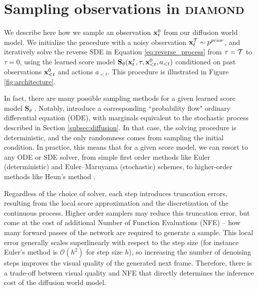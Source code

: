 \section{Sampling observations in \textsc{diamond}}
\label{appendix:sampling}

We describe here how we sample an observation $\mathbf{x}_t^0$ from our diffusion world model. We initialize the procedure with a noisy observation $\mathbf{x}_t^{\mathcal{T}} \sim p^{prior}$, and iteratively solve the reverse SDE in Equation \ref{eq:reverse_process} from $\tau = \mathcal{T}$ to $\tau = 0$, using the learned score model $\mathbf{S}_\theta(\mathbf{x}_t^\tau, \tau, \mathbf{x}_{<t}^0, a_{<t})$ conditioned on past observations $\mathbf{x}_{<t}^0$ and actions $a_{<t}$. This procedure is illustrated in Figure \ref{fig:architecture}.

In fact, there are many possible sampling methods for a given learned score model $\mathbf{S}_\theta$ \citep{karras2022elucidating}. Notably, \citet{song_sde} introduce a corresponding ``probability flow" ordinary differential equation (ODE), with marginals equivalent to the stochastic process described in Section \ref{subsec:diffusion}. In that case, the solving procedure is deterministic, and the only randomness comes from sampling the initial condition. In practice, this means that for a given score model, we can resort to any ODE or SDE solver, from simple first order methods like Euler (deterministic) and Euler–Maruyama (stochastic) schemes, to higher-order methods like Heun's method \citep{ascher1998computer}. 

Regardless of the choice of solver, each step introduces truncation errors, resulting from the local score approximation and the discretization of the continuous process. Higher order samplers may reduce this truncation error, but come at the cost of additional Number of Function Evaluations (NFE) -- how many forward passes of the network are required to generate a sample. This local error generally scales superlinearly with respect to the step size (for instance Euler's method is $\mathcal{O}(h^2)$ for step size $h$), so increasing the number of denoising steps improves the visual quality of the generated next frame. Therefore, there is a trade-off between visual quality and NFE that directly determines the inference cost of the diffusion world model.




